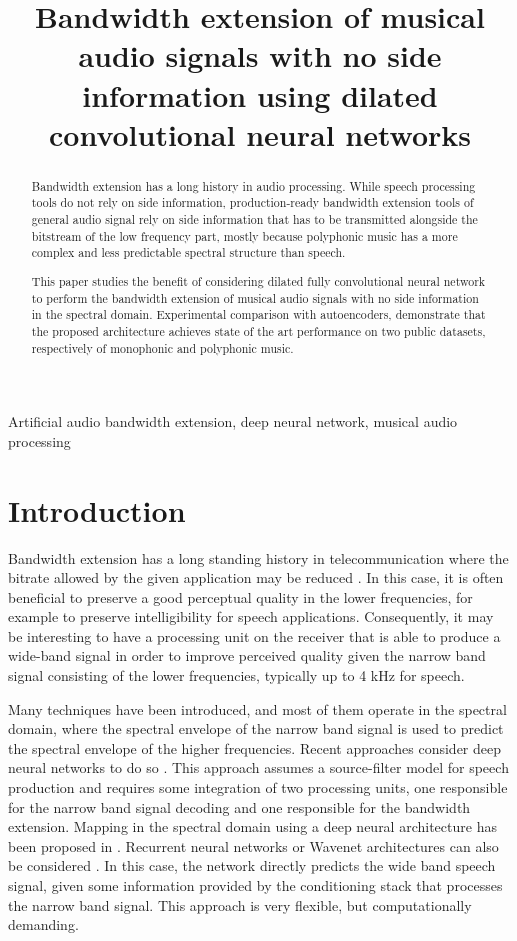\documentclass{article}
\title{Bandwidth extension of musical audio signals with no side information using dilated convolutional neural networks}
\begin{document}
%
\maketitle
%
\begin{abstract}

Bandwidth extension has a long history in audio processing. While speech processing tools do not rely on side information, production-ready bandwidth extension tools of general audio signal rely on side information that has to be transmitted alongside the bitstream of the low frequency part, mostly because polyphonic music has a more complex and less predictable spectral structure than speech.

This paper studies the benefit of considering dilated fully convolutional neural network to perform the bandwidth extension of musical audio signals with no side information in the spectral domain. Experimental comparison with autoencoders, demonstrate that the proposed architecture achieves state of the art performance on two public datasets, respectively of monophonic and polyphonic music.


\end{abstract}
%
\begin{keywords}
Artificial audio bandwidth extension, deep neural network, musical audio processing
\end{keywords}
%
\section{Introduction}
\label{sec:intro}

Bandwidth extension has a long standing history in telecommunication where the bitrate allowed by the given application may be reduced \cite{larsen2005audio}. In this case, it is often beneficial to preserve a good perceptual quality in the lower frequencies, for example to preserve intelligibility for speech applications. Consequently, it may be interesting to have a processing unit on the receiver that is able to produce a wide-band signal in order to improve perceived quality given the narrow band signal consisting of the lower frequencies, typically up to 4 kHz for speech.

Many techniques have been introduced, and most of them operate in the spectral domain, where the spectral envelope of the narrow band signal is used to predict the spectral envelope of the higher frequencies. Recent approaches consider deep neural networks to do so \cite{abel2017artificial}. This approach assumes a source-filter model for speech production and requires some integration of two processing units, one responsible for the narrow band signal decoding and one responsible for the bandwidth extension. Mapping in the spectral domain using a deep neural architecture has been proposed in \cite{li2015deep}. Recurrent neural networks \cite{ling2018waveform} or Wavenet architectures can also be considered \cite{gupta2019speech}. In this case, the network directly predicts the wide band speech signal, given some information provided by the conditioning stack that processes the narrow band signal. This approach is very flexible, but computationally demanding.
\end{document}
